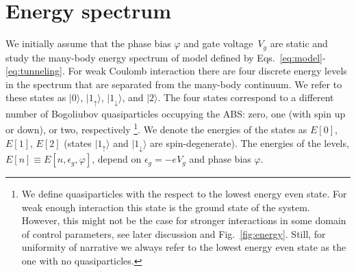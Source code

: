 \documentclass[aps,reprint,longbibliography, prb]{revtex4-2}
\begin{document}
\section{Energy spectrum}
\label{sec:spectrum}

We initially assume that the phase bias $\varphi$ and gate voltage~$V_g$ are static and study the many-body energy spectrum of model defined by Eqs.~\eqref{eq:model}-\eqref{eq:tunneling}. For weak Coulomb interaction there are four discrete energy levels in the spectrum that are separated from the many-body continuum. We refer to these states as $|0\rangle$, $|1_\uparrow\rangle$, $|1_\downarrow\rangle$, and $|2\rangle$. The four states correspond to a different number of Bogoliubov quasiparticles occupying the ABS:
zero, one (with spin up or down), or two, respectively \footnote{We define quasiparticles with the respect to the lowest energy even state. For weak enough interaction this state is the ground state of the system. However, this might not be the case for stronger interactions in some domain of control parameters, see later discussion and Fig.~\ref{fig:energy}. Still, for uniformity of narrative we always refer to the lowest energy even state as the one with no quasiparticles.}. We denote the energies of the states as $E[0]$, $E[1]$, $E[2]$ (states $|1_\uparrow\rangle$ and $|1_\downarrow\rangle$ are spin-degenerate). The energies of the levels, $E[n]\equiv E[n, \epsilon_g, \varphi]$, depend on $\epsilon_g = - e V_g$ and phase bias $\varphi$.
\end{document}
